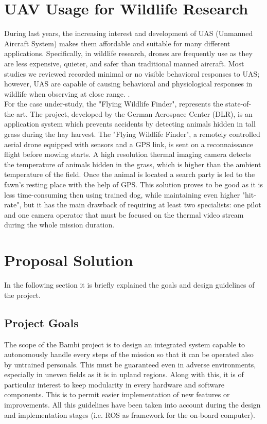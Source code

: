 \section{UAV Usage for Wildlife Research} %
\label{sec:state_of_the_art}
 During last years, the increasing interest and development of UAS (Unmanned Aircraft System) makes them affordable and suitable for many different applications. Specifically, in wildlife research, drones are frequently use as they are less expensive, quieter, and safer than traditional manned aircraft. Most studies we reviewed recorded minimal or no visible behavioral responses to UAS; however, UAS are capable of causing behavioral and physiological responses in wildlife when observing at close range. \cite{doi:10.1002/fee.1281}.\\
 For the case under-study, the "Flying Wildlife Finder", represents the state-of-the-art.
 The project, developed by the German Aerospace Center (DLR), is an application system which prevents accidents by detecting animals hidden in tall grass during the hay harvest. 
 The "Flying Wildlife Finder", a remotely controlled aerial drone equipped with sensors and a GPS link, is sent on a reconnaissance flight before mowing starts. A high resolution thermal imaging camera detects the temperature of animals hidden in the grass, which is higher than the ambient temperature of the field. Once the animal is located a search party is led to the fawn’s resting place with the help of GPS.
 This solution proves to be good as it is less time-consuming then using trained dog, while maintaining even higher "hit-rate", but it has the main drawback of requiring at least two specialists: one pilot and one camera operator that must be focused on the thermal video stream during the whole mission duration.

 
 
 \section{Proposal Solution} %
 \label{sec:proposal_solution}
 In the following section it is briefly explained the goals and design guidelines of the project.

 \subsection{Project Goals} %
 \label{sec:bambisaver_goals}
 The scope of the Bambi project is to design an integrated system capable to autonomously handle every steps of the mission so that it can be operated also by untrained personals. This must be guaranteed even in adverse environments, especially in uneven fields as it is in upland regions. 
 Along with this, it is of particular interest to keep modularity in every hardware and software components. This is to permit easier implementation of new features or improvements.
 All this guidelines  have been taken into account during the design and implementation stages (i.e. ROS as framework for the on-board computer).

